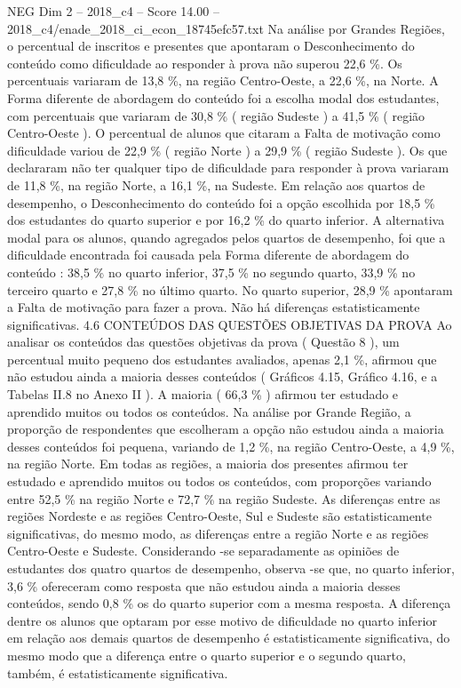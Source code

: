\begin{textsample}{NEG Dim 2 – 2018\_c4 – Score 14.00 – 2018\_c4/enade\_2018\_ci\_econ\_18745efc57.txt}
Na análise por Grandes Regiões, o percentual de inscritos e presentes que apontaram o Desconhecimento do conteúdo como dificuldade ao responder à prova não superou 22,6 \%.
Os percentuais variaram de 13,8 \%, na região Centro-Oeste, a 22,6 \%, na Norte.
A Forma diferente de abordagem do conteúdo foi a escolha modal dos estudantes, com percentuais que variaram de 30,8 \% ( região Sudeste ) a 41,5 \% ( região Centro-Oeste ).
O percentual de alunos que citaram a Falta de motivação como dificuldade variou de 22,9 \% ( região Norte ) a 29,9 \% ( região Sudeste ).
Os que declararam não ter qualquer tipo de dificuldade para responder à prova variaram de 11,8 \%, na região Norte, a 16,1 \%, na Sudeste.
Em relação aos quartos de desempenho, o Desconhecimento do conteúdo foi a opção escolhida por 18,5 \% dos estudantes do quarto superior e por 16,2 \% do quarto inferior.
A alternativa modal para os alunos, quando agregados pelos quartos de desempenho, foi que a dificuldade encontrada foi causada pela Forma diferente de abordagem do conteúdo : 38,5 \% no quarto inferior, 37,5 \% no segundo quarto, 33,9 \% no terceiro quarto e 27,8 \% no último quarto.
No quarto superior, 28,9 \% apontaram a Falta de motivação para fazer a prova.
Não há diferenças estatisticamente significativas. 4.6 CONTEÚDOS DAS QUESTÕES OBJETIVAS DA PROVA Ao analisar os conteúdos das questões objetivas da prova ( Questão 8 ), um percentual muito pequeno dos estudantes avaliados, apenas 2,1 \%, afirmou que não estudou ainda a maioria desses conteúdos ( Gráficos 4.15, Gráfico 4.16, e a Tabelas II.8 no Anexo II ).
A maioria ( 66,3 \% ) afirmou ter estudado e aprendido muitos ou todos os conteúdos.
Na análise por Grande Região, a proporção de respondentes que escolheram a opção não estudou ainda a maioria desses conteúdos foi pequena, variando de 1,2 \%, na região Centro-Oeste, a 4,9 \%, na região Norte.
Em todas as regiões, a maioria dos presentes afirmou ter estudado e aprendido muitos ou todos os conteúdos, com proporções variando entre 52,5 \% na região Norte e 72,7 \% na região Sudeste.
As diferenças entre as regiões Nordeste e as regiões Centro-Oeste, Sul e Sudeste são estatisticamente significativas, do mesmo modo, as diferenças entre a região Norte e as regiões Centro-Oeste e Sudeste.
Considerando -se separadamente as opiniões de estudantes dos quatro quartos de desempenho, observa -se que, no quarto inferior, 3,6 \% ofereceram como resposta que não estudou ainda a maioria desses conteúdos, sendo 0,8 \% os do quarto superior com a mesma resposta.
A diferença dentre os alunos que optaram por esse motivo de dificuldade no quarto inferior em relação aos demais quartos de desempenho é estatisticamente significativa, do mesmo modo que a diferença entre o quarto superior e o segundo quarto, também, é estatisticamente significativa.

\end{textsample}
